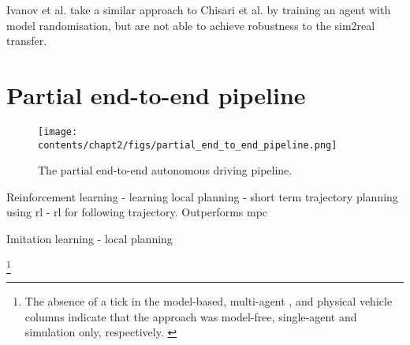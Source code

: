 \cite{Ivanov2020}
Ivanov et al. \cite{Ivanov2020} take a similar approach to Chisari et al. \cite{Chisari2021} by training an agent with model randomisation, but are not able to achieve robustness to the sim2real transfer.


\section{Partial end-to-end pipeline}
\label{sec:partial_end_to_end}

\begin{figure}[h]
    \centering
    \texttt{[image: contents/chapt2/figs/partial\_end\_to\_end\_pipeline.png]}
    \caption{The partial end-to-end autonomous driving pipeline.}
    \label{fig:partial_end_to_end}
\end{figure}

Reinforcement learning
\cite{Evans2021b} - learning local planning
\cite{Capo2020} - short term trajectory planning using rl
\cite{Ghignone2022} - rl for following trajectory. Outperforms mpc

Imitation learning
\cite{Weiss2020a} - local planning
\cite{Weiss2020}

\begin{landscape}
    
    \footnote{The absence of a tick in the model-based, multi-agent , and physical vehicle columns indicate that the approach was model-free, single-agent and simulation only, respectively. \label{footnote_1}}
\end{landscape}